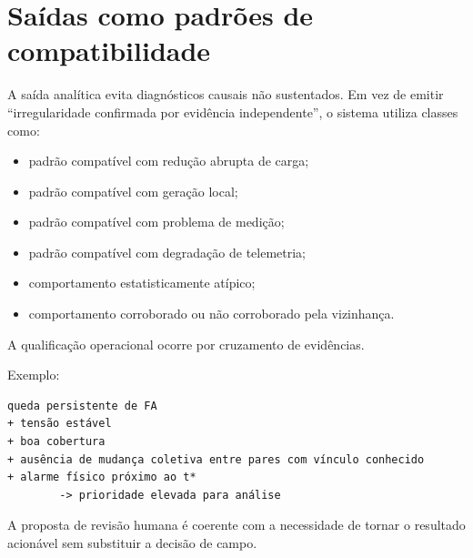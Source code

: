 \chapter{Saídas como padrões de compatibilidade}\label{sauxeddas-como-padruxf5es-de-compatibilidade}

A saída analítica evita diagnósticos causais não sustentados. Em vez de emitir ``irregularidade confirmada por evidência independente'', o sistema utiliza classes como:

\begin{itemize}
\item
  padrão compatível com redução abrupta de carga;
\item
  padrão compatível com geração local;
\item
  padrão compatível com problema de medição;
\item
  padrão compatível com degradação de telemetria;
\item
  comportamento estatisticamente atípico;
\item
  comportamento corroborado ou não corroborado pela vizinhança.
\end{itemize}

A qualificação operacional ocorre por cruzamento de evidências.

Exemplo:

\begin{verbatim}
queda persistente de FA
+ tensão estável
+ boa cobertura
+ ausência de mudança coletiva entre pares com vínculo conhecido
+ alarme físico próximo ao t*
        -> prioridade elevada para análise
\end{verbatim}

A proposta de revisão humana é coerente com a necessidade de tornar o resultado acionável sem substituir a decisão de campo.



